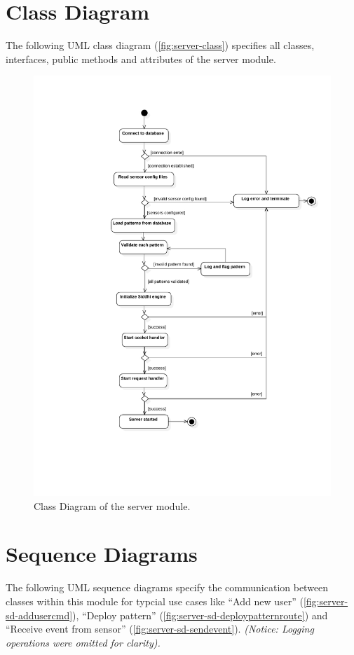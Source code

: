 \section{Class Diagram}
The following UML class diagram (\autoref{fig:server-class}) specifies all
classes, interfaces, public methods and attributes of the server module.

\FloatBarrier
\begin{figure}[h]
    \centering
    \includegraphics[width=\textwidth]{../module_res/server-act-start.pdf}
    \caption{Class Diagram of the server module.
    \label{fig:server-class}}
\end{figure}
\FloatBarrier


\section{Sequence Diagrams}
The following UML sequence diagrams specify the communication between classes
within this module for typcial use cases like
\enquote{Add new user} (\autoref{fig:server-sd-addusercmd}),
\enquote{Deploy pattern} (\autoref{fig:server-sd-deploypatternroute}) and
\enquote{Receive event from sensor} (\autoref{fig:server-sd-sendevent}).
\emph{(Notice: Logging operations were omitted for clarity).}

